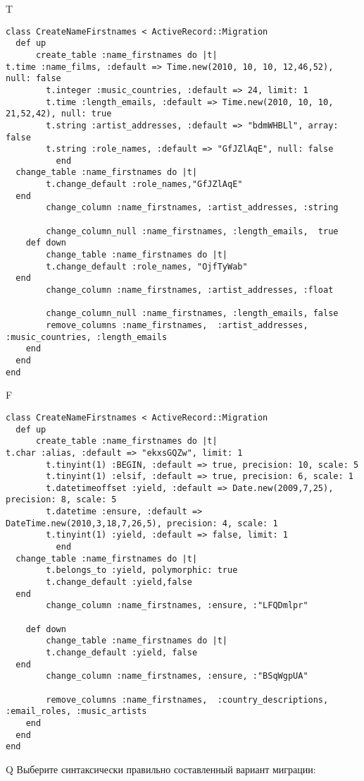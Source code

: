 T
\begin{verbatim}
class CreateNameFirstnames < ActiveRecord::Migration
  def up
	  create_table :name_firstnames do |t|
t.time :name_films, :default => Time.new(2010, 10, 10, 12,46,52), null: false
		t.integer :music_countries, :default => 24, limit: 1
		t.time :length_emails, :default => Time.new(2010, 10, 10, 21,52,42), null: true
		t.string :artist_addresses, :default => "bdmWHBLl", array: false
		t.string :role_names, :default => "GfJZlAqE", null: false
		  end
  change_table :name_firstnames do |t|
		t.change_default :role_names,"GfJZlAqE"
  end
 		change_column :name_firstnames, :artist_addresses, :string
   
		change_column_null :name_firstnames, :length_emails,  true
	def down
		change_table :name_firstnames do |t|
		t.change_default :role_names, "OjfTyWab"
  end
 		change_column :name_firstnames, :artist_addresses, :float
   
		change_column_null :name_firstnames, :length_emails, false
 		remove_columns :name_firstnames,  :artist_addresses, :music_countries, :length_emails 
    end 
  end
end

\end{verbatim}

F
\begin{verbatim}
class CreateNameFirstnames < ActiveRecord::Migration
  def up
	  create_table :name_firstnames do |t|
t.char :alias, :default => "ekxsGQZw", limit: 1
		t.tinyint(1) :BEGIN, :default => true, precision: 10, scale: 5
		t.tinyint(1) :elsif, :default => true, precision: 6, scale: 1
		t.datetimeoffset :yield, :default => Date.new(2009,7,25), precision: 8, scale: 5
		t.datetime :ensure, :default => DateTime.new(2010,3,18,7,26,5), precision: 4, scale: 1
		t.tinyint(1) :yield, :default => false, limit: 1
		  end
  change_table :name_firstnames do |t|
		t.belongs_to :yield, polymorphic: true
 		t.change_default :yield,false
  end
 		change_column :name_firstnames, :ensure, :"LFQDmlpr"
   
	def down
		change_table :name_firstnames do |t|
		t.change_default :yield, false
  end
 		change_column :name_firstnames, :ensure, :"BSqWgpUA"
   
		remove_columns :name_firstnames,  :country_descriptions, :email_roles, :music_artists 
    end 
  end
end

\end{verbatim}

Q
Выберите синтаксически правильно составленный вариант миграции:

